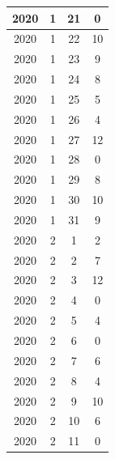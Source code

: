\begin{longtable} {|c|c|c|c|}
\hline
2020         & 1            & 21           & 0                         \\ 
\hline
2020         & 1            & 22           & 10                        \\ 
\hline
2020         & 1            & 23           & 9                         \\ 
\hline
2020         & 1            & 24           & 8                         \\ 
\hline
2020         & 1            & 25           & 5                         \\ 
\hline
2020         & 1            & 26           & 4                         \\ 
\hline
2020         & 1            & 27           & 12                        \\ 
\hline
2020         & 1            & 28           & 0                         \\ 
\hline
2020         & 1            & 29           & 8                         \\ 
\hline
2020         & 1            & 30           & 10                        \\ 
\hline
2020         & 1            & 31           & 9                         \\ 
\hline
2020         & 2            & 1            & 2                         \\ 
\hline
2020         & 2            & 2            & 7                         \\ 
\hline
2020         & 2            & 3            & 12                        \\ 
\hline
2020         & 2            & 4            & 0                         \\ 
\hline
2020         & 2            & 5            & 4                         \\ 
\hline
2020         & 2            & 6            & 0                         \\ 
\hline
2020         & 2            & 7            & 6                         \\ 
\hline
2020         & 2            & 8            & 4                         \\ 
\hline
2020         & 2            & 9            & 10                        \\ 
\hline
2020         & 2            & 10           & 6                         \\ 
\hline
2020         & 2            & 11           & 0                         \\ 

\end{longtable}
